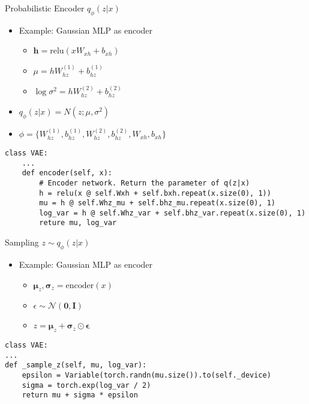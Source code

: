 \documentclass{beamer}
\newcommand{\relu}{\mathrm{relu}}
\newcommand{\encoder}{\mathrm{encoder}}
\begin{document}
\begin{frame}[fragile]{Probabilistic Encoder $q_\phi(z|x)$}
\begin{itemize}
	\item Example: Gaussian MLP as encoder
	\begin{itemize}
		\item $\bm{h} = \relu\left(x W_{xh}+b_{xh}\right)$
		\item $\mu = h W^{(1)}_{hz}+b^{(1)}_{hz}$
		\item $\log \sigma^2 = h W^{(2)}_{hz}+b^{(2)}_{hz}$
	\end{itemize}
	\item $q_\phi(z|x)=N(z;\mu, \sigma^2)$
	\item $\phi = \{W^{(1)}_{hz}, b^{(1)}_{hz}, W^{(2)}_{hz}, b^{(2)}_{hz}, W_{xh}, b_{xh}\}$
\end{itemize}
\begin{verbatim}
class VAE:
    ...
    def encoder(self, x):
        # Encoder network. Return the parameter of q(z|x)
        h = relu(x @ self.Wxh + self.bxh.repeat(x.size(0), 1))  
        mu = h @ self.Whz_mu + self.bhz_mu.repeat(x.size(0), 1)      
        log_var = h @ self.Whz_var + self.bhz_var.repeat(x.size(0), 1)
        reture mu, log_var
\end{verbatim}
\end{frame}

\begin{frame}[fragile]{Sampling $z\sim q_\phi(z|x)$}
\begin{itemize}
	\item Example: Gaussian MLP as encoder
	\begin{itemize}
		\item $\bm{\mu}_z, \bm{\sigma}_z=\encoder(x)$
		\item $\epsilon \sim \mathcal{N}(\bm{0}, \bm{I})$
		\item $z = \bm{\mu}_z + \bm{\sigma}_z \odot \bm{\epsilon} $
	\end{itemize}
\end{itemize}
\begin{verbatim}
class VAE:
...
def _sample_z(self, mu, log_var):
    epsilon = Variable(torch.randn(mu.size()).to(self._device)
    sigma = torch.exp(log_var / 2)
    return mu + sigma * epsilon
\end{verbatim}
\end{frame}
\end{document}
